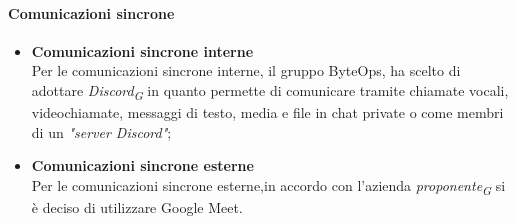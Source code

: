 \paragraph{Comunicazioni sincrone}
\begin{itemize}
	\item \textbf{Comunicazioni sincrone interne} \\
	Per le comunicazioni sincrone interne, il gruppo ByteOps, ha scelto di adottare \textit{Discord}\textsubscript{\textit{G}} in quanto permette di comunicare tramite chiamate vocali, videochiamate, messaggi di testo, media e file in chat private o come membri di un \textit{"server Discord"};

	\item \textbf{Comunicazioni sincrone esterne} \\
	Per le comunicazioni sincrone esterne,in accordo con l'azienda \textit{proponente}\textsubscript{\textit{G}} si è deciso di utilizzare Google Meet.
\end{itemize}

